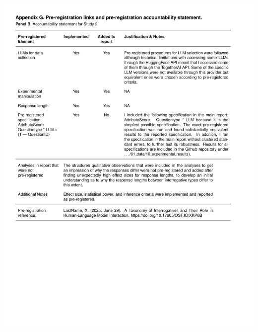 \documentclass[
  12pt,
]{article}
\begin{document}
\begin{center}\includegraphics{../03_outputs/04_appendices/appendix_g_ii} \end{center}
\end{document}
